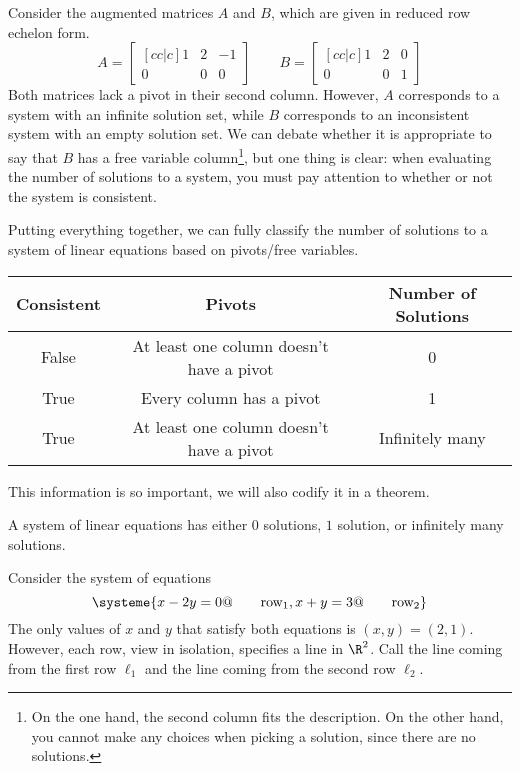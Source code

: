 	Consider the augmented matrices $A$ and $B$, which are given in reduced row echelon form.
	\[
		A=\begin{bmatrix}[cc|c]
			1&2&-1\\0&0&0
		\end{bmatrix}
		\qquad
		B=\begin{bmatrix}[cc|c]
			1&2&0\\0&0&1
		\end{bmatrix}
	\]
	Both matrices lack a pivot in their second column. However, $A$ corresponds to a system with an infinite solution
	set, while $B$ corresponds to an inconsistent system with an empty solution set. We can debate whether it is appropriate
	to say that $B$ has a free variable column\footnote{ On the one hand, the second column fits the description. On the other hand,
	you cannot make any choices when picking a solution, since there are no solutions.}, but one thing is clear:
	when evaluating the number of solutions to a system, you must pay attention to whether or not the system is consistent.


	Putting everything together, we can fully classify the number of solutions to a system of linear equations
	based on pivots/free variables.

	\begin{center}
		\begin{tabular}{ccc}
			Consistent & Pivots & Number of Solutions\\
			\hline
			False & At least one column doesn't have a pivot & 0\\
			True & Every column has a pivot & 1\\
			True & At least one column doesn't have a pivot & Infinitely many\\
		\end{tabular}
	\end{center}

	This information is so important, we will also codify it in a theorem.

	\begin{theorem}
		A system of linear equations has either $0$ solutions, $1$ solution, or infinitely many solutions.
	\end{theorem}
	

	Consider the system of equations
	\begin{equation}
		\label{EQINTERSECTINGLINES}
		\systeme{
			x-2y=0@\qquad\text{row}_1,
			x+y=3@\qquad\text{row}_2
		}
	\end{equation}
	The only values of $x$ and $y$ that satisfy both equations is
	$(x,y)=(2,1)$. However, each row, view in isolation, specifies a line in $\R^2$. Call the line
	coming from the first row $\ell_1$ and the line coming from the second row $\ell_2$.

